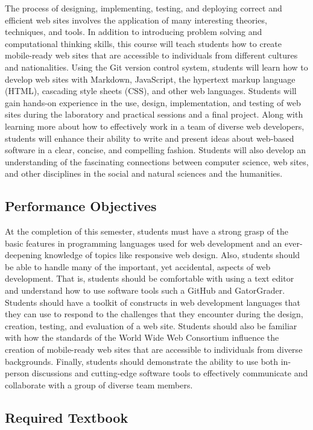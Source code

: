 \documentclass[11pt]{article}
\begin{document}
The process of designing, implementing, testing, and deploying correct and efficient web sites involves the application
of many interesting theories, techniques, and tools. In addition to introducing problem solving and computational
thinking skills, this course will teach students how to create mobile-ready web sites that are accessible to individuals
from different cultures and nationalities. Using the Git version control system, students will learn how to develop web
sites with Markdown, JavaScript, the hypertext markup language (HTML), cascading style sheets (CSS), and other web
languages. Students will gain hands-on experience in the use, design, implementation, and testing of web sites during
the laboratory and practical sessions and a final project. Along with learning more about how to effectively work in a
team of diverse web developers, students will enhance their ability to write and present ideas about web-based software
in a clear, concise, and compelling fashion. Students will also develop an understanding of the fascinating connections
between computer science, web sites, and other disciplines in the social and natural sciences and the humanities.

\subsection*{Performance Objectives}

At the completion of this semester, students must have a strong grasp of the basic features in programming languages
used for web development and an ever-deepening knowledge of topics like responsive web design. Also, students should be
able to handle many of the important, yet accidental, aspects of web development. That is, students should be
comfortable with using a text editor and understand how to use software tools such a GitHub and GatorGrader. Students
should have a toolkit of constructs in web development languages that they can use to respond to the challenges that
they encounter during the design, creation, testing, and evaluation of a web site. Students should also be familiar with
how the standards of the World Wide Web Consortium influence the creation of mobile-ready web sites that are accessible
to individuals from diverse backgrounds. Finally, students should demonstrate the ability to use both in-person
discussions and cutting-edge software tools to effectively communicate and collaborate with a group of diverse team
members.

\subsection*{Required Textbook}
\end{document}
